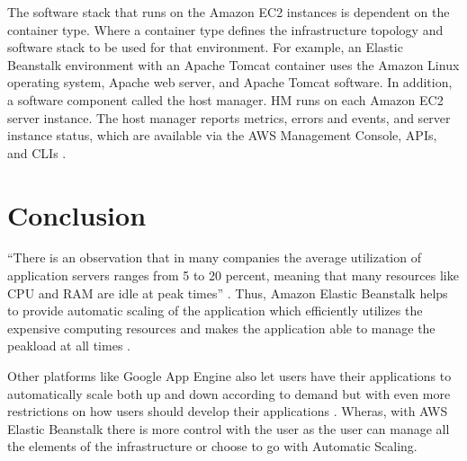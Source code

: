 \documentclass[9pt,twocolumn,twoside]{../../styles/osajnl}
\begin{document}
The software stack that runs on the Amazon EC2 instances is dependent
on the container type. Where a container type defines the
infrastructure topology and software stack to be used for that
environment. For example, an Elastic Beanstalk environment with an
Apache Tomcat container uses the Amazon Linux operating system, Apache
web server, and Apache Tomcat software. In addition, a software
component called the host manager. HM runs on each Amazon EC2 server
instance. The host manager reports metrics, errors and events, and
server instance status, which are available via the AWS Management
Console, APIs, and CLIs \cite{elastic-architecture}.

\section{Conclusion}

``There is an observation that in many companies the average
utilization of application servers ranges from 5 to 20 percent,
meaning that many resources like CPU and RAM are idle at peak times''
\cite{cloudcomputing-2}. Thus, Amazon Elastic Beanstalk helps to
provide automatic scaling of the application which efficiently
utilizes the expensive computing resources and makes the application
able to manage the peakload at all times \cite{elastic-faq} .

Other platforms like Google App Engine also let users have their
applications to automatically scale both up and down according to
demand but with even more restrictions on how users should develop
their applications \cite{google-appengine} . Wheras, with AWS Elastic
Beanstalk there is more control with the user as the user can manage
all the elements of the infrastructure or choose to go with Automatic
Scaling.



 
\end{document}
